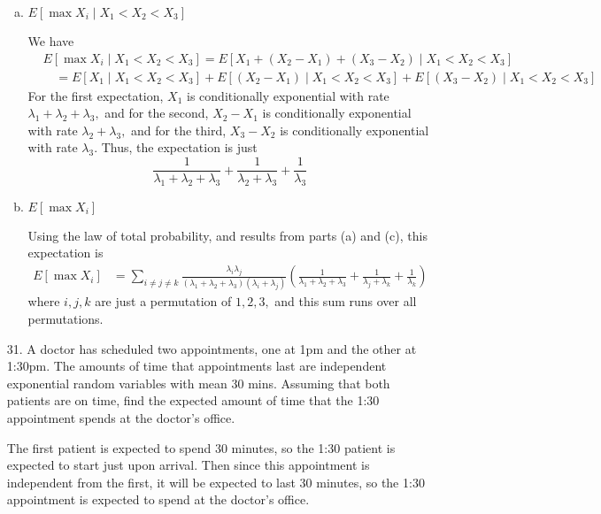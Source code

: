 \documentclass{article}
\begin{document}
\begin{itemize}
\begin{enumerate}[(a)]
			\item $E[\max X_i\mid X_1<X_2<X_3]$
				\begin{soln}
					We have
					\begin{align*}
						&E[\max X_i\mid X_1<X_2<X_3] = E[X_1+(X_2-X_1)+(X_3-X_2)\mid X_1<X_2<X_3] \\
						&\quad= E[X_1\mid X_1<X_2<X_3] + E[(X_2-X_1)\mid X_1<X_2<X_3] + E[(X_3-X_2)\mid X_1<X_2<X_3]
					\end{align*}
					For the first expectation, $X_1$ is conditionally exponential with rate $\lambda_1+\lambda_2+\lambda_3,$ and for the second, $X_2-X_1$ is conditionally exponential with rate $\lambda_2+\lambda_3,$ and for the third, $X_3-X_2$ is conditionally exponential with rate $\lambda_3.$ Thus, the expectation is just
					\[\frac{1}{\lambda_1+\lambda_2+\lambda_3} + \frac{1}{\lambda_2+\lambda_3} + \frac{1}{\lambda_3}\]
				\end{soln}

			\item $E[\max X_i]$
				\begin{soln}
					Using the law of total probability, and results from parts (a) and (c), this expectation is
					\begin{align*}
						E[\max X_i] &= \sum_{i\neq j\neq k}^{}\frac{\lambda_i\lambda_j}{(\lambda_1+\lambda_2+\lambda_3)(\lambda_i+\lambda_j)}\left( \frac{1}{\lambda_1+\lambda_2+\lambda_3} + \frac{1}{\lambda_j+\lambda_k} + \frac{1}{\lambda_k} \right)
					\end{align*}
					where $i, j, k$ are just a permutation of $1, 2, 3,$ and this sum runs over all permutations.
				\end{soln}

		\end{enumerate}

	\item[31.] A doctor has scheduled two appointments, one at 1pm and the other at 1:30pm. The amounts of time that appointments last are independent exponential random variables with mean 30 mins. Assuming that both patients are on time, find the expected amount of time that the 1:30 appointment spends at the doctor's office.
		\begin{soln}
			The first patient is expected to spend 30 minutes, so the 1:30 patient is expected to start just upon arrival. Then since this appointment is independent from the first, it will be expected to last 30 minutes, so the 1:30 appointment is expected to spend  at the doctor's office.
		\end{soln}


\end{itemize}
\end{document}

